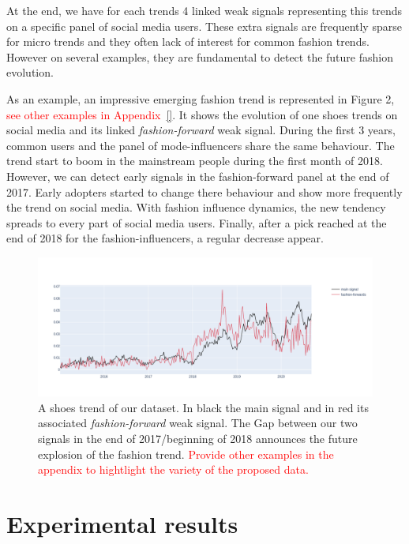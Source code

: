 \documentclass[letterpaper]{article} %
\begin{document}
At the end, we have for each trends 4 linked weak signals representing this trends on a specific panel of social media users. These extra signals are frequently sparse for micro trends and they often lack of interest for common fashion trends. However on several examples, they are fundamental to detect the future fashion evolution. 

As an example, an impressive emerging fashion trend is represented in Figure 2, \textcolor{red}{see other examples in Appendix~\ref{}}. It shows the evolution of one shoes trends on social media and its linked \textit{fashion-forward} weak signal. During the first 3 years, common users and the panel of mode-influencers share the same behaviour. The trend start to boom in the mainstream people during the first month of 2018. However, we can detect early signals in the fashion-forward panel at the end of 2017. Early adopters started to change there behaviour and show more frequently the trend on social media. With fashion influence dynamics, the new tendency spreads to every part of social media users. Finally, after a pick reached at the end of 2018 for the fashion-influencers, a regular decrease appear. %

\begin{figure}
  \centering
    \includegraphics[width=1.\linewidth]{figure/good_example.png}
  \caption{A shoes trend of our dataset. In black the main signal and in red its associated \textit{fashion-forward} weak signal. The Gap between our two signals in the end of 2017/beginning of 2018 announces the future explosion of the fashion trend. \textcolor{red}{Provide other examples in the appendix to hightlight the variety of the proposed data.}}
\end{figure}



\section{Experimental results}
\label{sec:exp}
\end{document}
